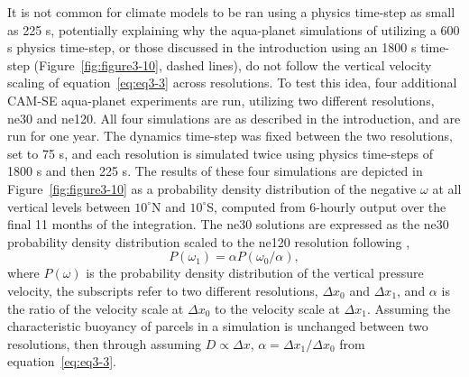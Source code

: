 It is not common for climate models to be ran using a physics time-step as small as 225 s, potentially explaining why the aqua-planet simulations of \cite{HR2017JCLIM} utilizing a 600 s physics time-step, or those discussed in the introduction using an 1800 s time-step (Figure~\ref{fig:figure3-10}, dashed lines), do not follow the vertical velocity scaling of equation~\ref{eq:eq3-3} across resolutions. To test this idea, four additional CAM-SE aqua-planet experiments are run, utilizing two different resolutions, ne30 and ne120. All four simulations are as described in the introduction, and are run for one year. The dynamics time-step was fixed between the two resolutions, set to 75 s, and each resolution is simulated twice using physics time-steps of 1800 s and then 225 s. The results of these four simulations are depicted in Figure~\ref{fig:figure3-10} as a probability density distribution of the negative $\omega$ at all vertical levels between $10^{\circ}$N and $10^{\circ}$S, computed from 6-hourly output over the final 11 months of the integration. The ne30 solutions are expressed as the ne30 probability density distribution scaled to the ne120 resolution following \cite{PG2006JAS},
\begin{equation}
P(\omega_1) = \alpha P(\omega_0 / \alpha), \label{eq:eq3-8}
\end{equation}
where $P(\omega)$ is the probability density distribution of the vertical pressure velocity, the subscripts refer to two different resolutions, $\Delta x_0$ and $\Delta x_1$, and $\alpha$ is the ratio of the velocity scale at $\Delta x_0$ to the velocity scale at $\Delta x_1$. Assuming the characteristic buoyancy of parcels in a simulation is unchanged between two resolutions, then through assuming $D \propto \Delta x$, $\alpha = \Delta x_1 / \Delta x_0$ from equation~\ref{eq:eq3-3}.

